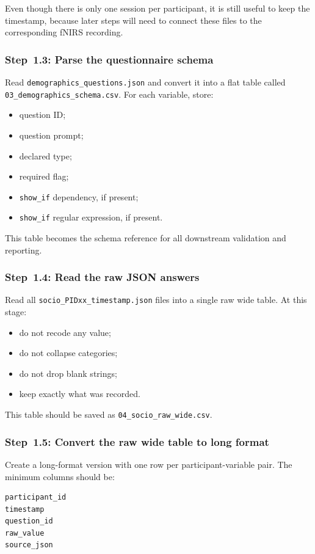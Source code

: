 \documentclass[11pt]{article}
\begin{document}
Even though there is only one session per participant, it is still useful to keep the timestamp,
because later steps will need to connect these files to the corresponding fNIRS recording.

\subsubsection{Step~1.3: Parse the questionnaire schema}
Read \texttt{demographics\_questions.json} and convert it into a flat table called
\texttt{03\_demographics\_schema.csv}.
For each variable, store:
\begin{itemize}
    \item question ID;
    \item question prompt;
    \item declared type;
    \item required flag;
    \item \texttt{show\_if} dependency, if present;
    \item \texttt{show\_if} regular expression, if present.
\end{itemize}

This table becomes the schema reference for all downstream validation and reporting. \cite{step1_demo_schema}

\subsubsection{Step~1.4: Read the raw JSON answers}
Read all \texttt{socio\_PIDxx\_timestamp.json} files into a single raw wide table.
At this stage:
\begin{itemize}
    \item do not recode any value;
    \item do not collapse categories;
    \item do not drop blank strings;
    \item keep exactly what was recorded.
\end{itemize}

This table should be saved as \texttt{04\_socio\_raw\_wide.csv}.

\subsubsection{Step~1.5: Convert the raw wide table to long format}
Create a long-format version with one row per participant-variable pair.
The minimum columns should be:
\begin{verbatim}
participant_id
timestamp
question_id
raw_value
source_json
\end{verbatim}
\end{document}
